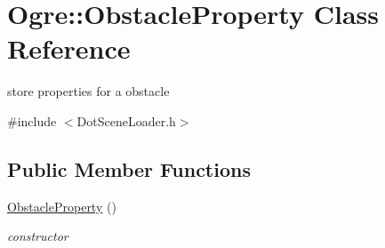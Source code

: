 \hypertarget{class_ogre_1_1_obstacle_property}{}\section{Ogre\+:\+:Obstacle\+Property Class Reference}
\label{class_ogre_1_1_obstacle_property}


store properties for a obstacle  




{\ttfamily \#include $<$Dot\+Scene\+Loader.\+h$>$}

\subsection*{Public Member Functions}
\begin{DoxyCompactItemize}
\item 
\hyperlink{class_ogre_1_1_obstacle_property_a3fdadc88931b0d7d475cafea2936c157}{Obstacle\+Property} ()\hypertarget{class_ogre_1_1_obstacle_property_a3fdadc88931b0d7d475cafea2936c157}{}\label{class_ogre_1_1_obstacle_property_a3fdadc88931b0d7d475cafea2936c157}

\begin{DoxyCompactList}\small\item\em constructor \end{DoxyCompactList}\end{DoxyCompactItemize}
